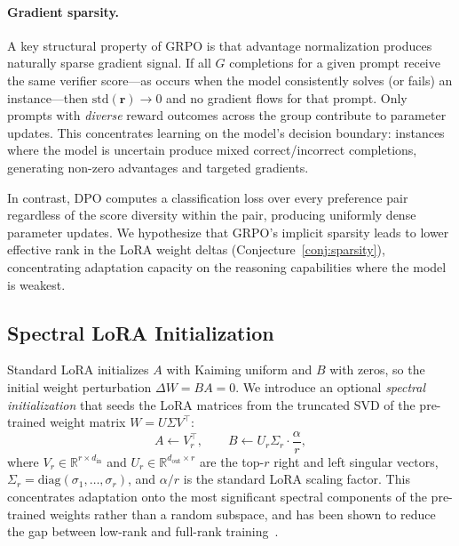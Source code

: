 \documentclass{article}
\theoremstyle{definition}
\begin{document}
\paragraph{Gradient sparsity.}  A key structural property of GRPO is that advantage normalization produces naturally sparse gradient signal.  If all $G$ completions for a given prompt receive the same verifier score---as occurs when the model consistently solves (or fails) an instance---then $\mathrm{std}(\mathbf{r}) \to 0$ and no gradient flows for that prompt.  Only prompts with \emph{diverse} reward outcomes across the group contribute to parameter updates.  This concentrates learning on the model's decision boundary: instances where the model is uncertain produce mixed correct/incorrect completions, generating non-zero advantages and targeted gradients.

In contrast, DPO computes a classification loss over every preference pair regardless of the score diversity within the pair, producing uniformly dense parameter updates.  We hypothesize that GRPO's implicit sparsity leads to lower effective rank in the LoRA weight deltas (Conjecture~\ref{conj:sparsity}), concentrating adaptation capacity on the reasoning capabilities where the model is weakest.


\subsection{Spectral LoRA Initialization}\label{subsec:spectral_lora}

Standard LoRA initializes $A$ with Kaiming uniform and $B$ with zeros, so the initial weight perturbation $\Delta W = BA = 0$.  We introduce an optional \emph{spectral initialization} that seeds the LoRA matrices from the truncated SVD of the pre-trained weight matrix $W = U \Sigma V^\top$:
\begin{equation}\label{eq:spectral_init}
    A \gets V_r^\top, \qquad B \gets U_r \Sigma_r \cdot \frac{\alpha}{r},
\end{equation}
where $V_r \in \mathbb{R}^{r \times d_{\mathrm{in}}}$ and $U_r \in \mathbb{R}^{d_{\mathrm{out}} \times r}$ are the top-$r$ right and left singular vectors, $\Sigma_r = \mathrm{diag}(\sigma_1, \ldots, \sigma_r)$, and $\alpha/r$ is the standard LoRA scaling factor.  This concentrates adaptation onto the most significant spectral components of the pre-trained weights rather than a random subspace, and has been shown to reduce the gap between low-rank and full-rank training~\cite{hu2022lora}.
\end{document}
